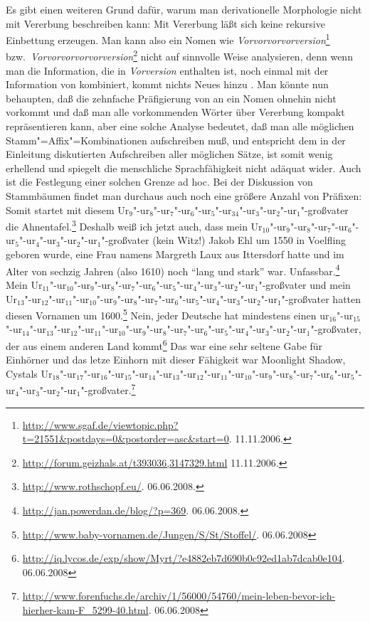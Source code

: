 Es gibt einen weiteren Grund dafür, warum man derivationelle Morphologie nicht mit Vererbung beschreiben kann:
Mit Vererbung läßt sich keine rekursive Einbettung erzeugen. Man kann also ein Nomen wie
\emph{Vorvorvorvorversion}\footnote{%
   \url{http://www.sgaf.de/viewtopic.php?t=21551&postdays=0&postorder=asc&start=0}. 11.11.2006.%
} bzw.\ \emph{Vorvorvorvorvorversion}\footnote{%
  \url{http://forum.geizhals.at/t393036,3147329.html} 11.11.2006.%
}
nicht auf sinnvolle Weise analysieren, denn wenn man die Information, die in \emph{Vorversion} enthalten
ist, noch einmal mit der Information von  kombiniert, kommt nichts Neues hinzu \citep{KN93a}.
Man könnte nun behaupten, daß die zehnfache Präfigierung von
 an ein Nomen ohnehin nicht vorkommt und daß man alle vorkommenden Wörter über Vererbung
kompakt repräsentieren kann, aber eine solche Analyse bedeutet, daß
man alle möglichen Stamm"=Affix"=Kombinationen aufschreiben muß, und entspricht dem in der Einleitung 
diskutierten Aufschreiben aller möglichen Sätze, ist somit wenig erhellend und spiegelt die
menschliche Sprachfähigkeit nicht adäquat wider. Auch ist die Festlegung einer solchen Grenze ad
hoc. Bei der Diskussion von Stammbäumen findet man durchaus auch noch eine größere Anzahl von
Präfixen:
\eal
\ex Somit startet mit diesem Ur$_9$"-ur$_8$"-ur$_7$"-ur$_6$"-ur$_5$"-ur$_34$"-ur$_3$"-ur$_2$"-ur$_1$"-großvater die Ahnentafel.\footnote{
  \url{http://www.rothschopf.eu/}. 06.06.2008.
}
\ex Deshalb weiß ich jetzt auch, dass mein Ur$_{10}$"-ur$_9$"-ur$_8$"-ur$_7$"-ur$_6$"-ur$_5$"-ur$_4$"-ur$_3$"-ur$_2$"-ur$_1$"-großvater (kein Witz!) Jakob Ehl um
1550 in Voelfling geboren wurde, eine Frau namens Margreth Laux aus Ittersdorf hatte und im Alter
von sechzig Jahren (also 1610) noch "`lang und stark"' war. Unfassbar.\footnote{
  \url{http://jan.powerdan.de/blog/?p=369}. 06.06.2008.
}
\ex Mein Ur$_{11}$"-ur$_{10}$"-ur$_9$"-ur$_8$"-ur$_7$"-ur$_6$"-ur$_5$"-ur$_4$"-ur$_3$"-ur$_2$"-ur$_1$"-großvater und mein Ur$_{13}$"-ur$_{12}$"-ur$_{11}$"-ur$_{10}$"-ur$_9$"-ur$_8$"-ur$_7$"-ur$_6$"-ur$_5$"-ur$_4$"-ur$_3$"-ur$_2$"-ur$_1$"-großvater hatten diesen
Vornamen um 1600.\footnote{
  \url{http://www.baby-vornamen.de/Jungen/S/St/Stoffel/}. 06.06.2008
}
\ex Nein, jeder Deutsche hat mindestens einen
ur$_{16}$"-ur$_{15}$"-ur$_{14}$"-ur$_{13}$"-ur$_{12}$"-ur$_{11}$"-ur$_{10}$"-ur$_9$"-ur$_8$"-ur$_7$"-ur$_6$"-ur$_5$"-ur$_4$"-ur$_3$"-ur$_2$"-ur$_1$"-großvater,
der aus einem anderen Land kommt\footnote{
  \url{http://iq.lycos.de/exp/show/Myrt/?e4882eb7d690b0c92ed1ab7dcab0e104}. 06.06.2008
}
\ex Das war eine sehr seltene Gabe für Einhörner und das letze Einhorn mit dieser Fähigkeit war
Moonlight Shadow, Cystals Ur$_{18}$"-ur$_{17}$"-ur$_{16}$"-ur$_{15}$"-ur$_{14}$"-ur$_{13}$"-ur$_{12}$"-ur$_{11}$"-ur$_{10}$"-ur$_{9}$"-ur$_{8}$"-ur$_{7}$"-ur$_{6}$"-ur$_{5}$"-ur$_{4}$"-ur$_{3}$"-ur$_{2}$"-ur$_{1}$"-großvater.\footnote{
\url{http://www.forenfuchs.de/archiv/1/56000/54760/mein-leben-bevor-ich-hierher-kam-F_5299-40.html}.
06.06.2008
}
\zl

